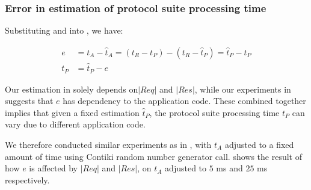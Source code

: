 \subsubsection{Error in estimation of protocol suite processing time}

Substituting  and  into , we have:

\begin{equation}\label{Eq: tP error}
	\begin{aligned}
		e &= t_A - \hat{t}_A = (t_R - t_P) - (t_R - \hat{t}_P) = \hat{t}_P - t_P\\
		t_P &= \hat{t}_P - e
	\end{aligned}
\end{equation}

Our estimation in  solely depends on$|Req|$ and $|Res|$, while our experiments in  suggests that $e$ has dependency to the application code. These combined together implies that given a fixed estimation $\hat{t}_P$, the protocol suite processing time $t_P$ can vary due to different application code.

We therefore conducted similar experiments as in , with $t_A$ adjusted to a fixed amount of time using Contiki random number generator call.  shows the result of how $e$ is affected by $|Req|$ and $|Res|$, on $t_A$ adjusted to $5$ ms and $25$ ms respectively.

